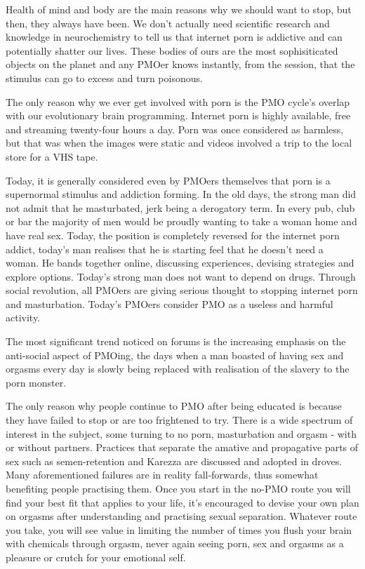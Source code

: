 \documentclass[easypeasy.tex]{subfiles}
\begin{document}
Health of mind and body are the main reasons why we should want to stop, but then, they always have been. We don't actually need scientific research and knowledge in neurochemistry to tell us that internet porn is addictive and can potentially shatter our lives. These bodies of ours are the most sophisiticated objects on the planet and any PMOer knows instantly, from the session, that the stimulus can go to excess and turn poisonous.

The only reason why we ever get involved with porn is the PMO cycle's overlap with our evolutionary brain programming. Internet porn is highly available, free and streaming twenty-four hours a day. Porn was once considered as harmless, but that was when the images were static and videos involved a trip to the local store for a VHS tape.

Today, it is generally considered even by PMOers themselves that porn is a supernormal stimulus and addiction forming. In the old days, the strong man did not admit that he masturbated, jerk being a derogatory term. In every pub, club or bar the majority of men would be proudly wanting to take a woman home and have real sex. Today, the position is completely reversed for the internet porn addict, today's man realises that he is starting feel that he doesn't need a woman. He bands together online, discussing experiences, devising strategies and explore options. Today's strong man does not want to depend on drugs. Through social revolution, all PMOers are giving serious thought to stopping internet porn and masturbation. Today's PMOers consider PMO as a useless and harmful activity.

The most significant trend noticed on forums is the increasing emphasis on the anti-social aspect of PMOing, the days when a man boasted of having sex and orgasms every day is slowly being replaced with realisation of the slavery to the porn monster.

The only reason why people continue to PMO after being educated is because they have failed to stop or are too frightened to try. There is a wide spectrum of interest in the subject, some turning to no porn, masturbation and orgasm - with or without partners. Practices that separate the amative and propagative parts of sex such as semen-retention and Karezza are discussed and adopted in droves. Many aforementioned failures are in reality fall-forwards, thus somewhat benefiting people practising them. Once you start in the no-PMO route you will find your best fit that applies to your life, it's encouraged to devise your own plan on orgasms after understanding and practising sexual separation. Whatever route you take, you will see value in limiting the number of times you flush your brain with chemicals through orgasm, never again seeing porn, sex and orgasms as a pleasure or crutch for your emotional self.
\end{document}
